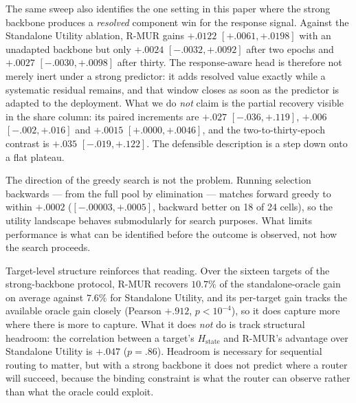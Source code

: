 The same sweep also identifies the one setting in this paper where the strong
backbone produces a \emph{resolved} component win for the response signal.
Against the Standalone Utility ablation, R-MUR gains $+.0122$
$[+.0061,+.0198]$ with an unadapted backbone but only $+.0024$
$[-.0032,+.0092]$ after two epochs and $+.0027$ $[-.0030,+.0098]$ after thirty.
The response-aware head is therefore not merely inert under a strong predictor:
it adds resolved value exactly while a systematic residual remains, and that
window closes as soon as the predictor is adapted to the deployment. What we do \emph{not}
claim is the partial recovery visible in the share column: its paired
increments are $+.027$ $[-.036,+.119]$, $+.006$ $[-.002,+.016]$ and $+.0015$
$[+.0000,+.0046]$, and the two-to-thirty-epoch contrast is $+.035$
$[-.019,+.122]$. The defensible description is a step down onto a flat plateau.

The direction of the greedy search is not the problem. Running selection
backwards --- from the full pool by elimination --- matches forward greedy to
within $+.0002$ ($[-.00003,+.0005]$, backward better on 18 of 24 cells), so the
utility landscape behaves submodularly for search purposes. What limits
performance is what can be identified before the outcome is observed, not how
the search proceeds.

Target-level structure reinforces that reading. Over the sixteen targets of the
strong-backbone protocol, R-MUR recovers $10.7\%$ of the
standalone-oracle gain on average against $7.6\%$ for Standalone Utility, and
its per-target gain tracks the available oracle gain closely (Pearson $+.912$,
$p<10^{-4}$),
so it does capture more where there is more to capture. What it does \emph{not} do
is track structural headroom: the correlation between a target's
$H_{\mathrm{state}}$ and R-MUR's advantage over Standalone Utility is
$+.047$ ($p=.86$). Headroom is necessary for sequential routing to matter, but with a
strong backbone it does not predict where a router will succeed, because the
binding constraint is what the router can observe rather than what the oracle
could exploit.

